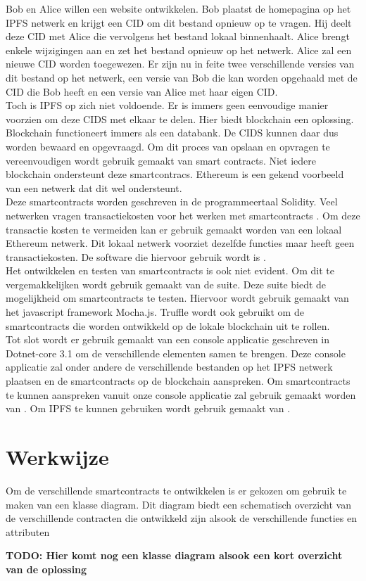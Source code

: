 Bob en Alice willen een website ontwikkelen. Bob plaatst de homepagina op het IPFS netwerk en krijgt een CID om dit bestand opnieuw op te vragen. Hij deelt deze CID met Alice die vervolgens het bestand lokaal binnenhaalt. Alice brengt enkele wijzigingen aan en zet het bestand opnieuw op het netwerk. Alice zal een nieuwe CID worden toegewezen. Er zijn nu in feite twee verschillende versies van dit bestand op het netwerk, een versie van Bob die kan worden opgehaald met de CID die Bob heeft en een versie van Alice met haar eigen CID.\\

Toch is IPFS op zich niet voldoende. Er is immers geen eenvoudige manier voorzien om deze CIDS met elkaar te delen. Hier biedt blockchain een oplossing. Blockchain functioneert immers als een databank. De CIDS kunnen daar dus worden bewaard en opgevraagd. Om dit proces van opslaan en opvragen te vereenvoudigen wordt gebruik gemaakt van smart contracts. Niet iedere blockchain ondersteunt deze smartcontracs. Ethereum is een gekend voorbeeld van een netwerk dat dit wel ondersteunt.\\

Deze smartcontracts worden geschreven in de programmeertaal Solidity. Veel netwerken vragen transactiekosten voor het werken met smartcontracts . Om deze transactie kosten te vermeiden kan er gebruik gemaakt worden van een lokaal Ethereum netwerk. Dit lokaal netwerk voorziet dezelfde functies maar heeft geen transactiekosten. De software die hiervoor gebruik wordt is \textcite{Ganache}.\\

Het ontwikkelen en testen van smartcontracts is ook niet evident. Om dit te vergemakkelijken wordt gebruik gemaakt van de \textcite{Truffle} suite. Deze suite biedt de mogelijkheid om smartcontracts te testen. Hiervoor wordt gebruik gemaakt van het javascript framework Mocha.js. Truffle wordt ook gebruikt om de smartcontracts die worden ontwikkeld op de lokale blockchain uit te rollen.\\

Tot slot wordt er gebruik gemaakt van een console applicatie geschreven in Dotnet-core 3.1 om de verschillende elementen samen te brengen. Deze console applicatie zal onder andere de verschillende bestanden op het IPFS netwerk plaatsen en de smartcontracts op de blockchain aanspreken. Om smartcontracts te kunnen aanspreken vanuit onze console applicatie zal gebruik gemaakt worden van \textcite{Nethereum}. Om IPFS te kunnen gebruiken wordt gebruik gemaakt van \textcite{IPFSClient}.\\

\section{Werkwijze}
Om de verschillende smartcontracts te ontwikkelen is er gekozen om gebruik te maken van een klasse diagram. Dit diagram biedt een schematisch overzicht van de verschillende contracten die ontwikkeld zijn alsook de verschillende functies en attributen

\textbf{TODO: Hier komt nog een klasse diagram alsook een kort overzicht van de oplossing}